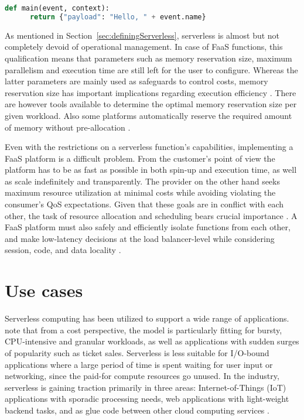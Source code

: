 \begin{lstlisting}[language=Python,caption=Example FaaS handler in Python,label=lst:handlerExample]
  def main(event, context):
      return {"payload": "Hello, " + event.name}
\end{lstlisting}

As mentioned in Section~\ref{sec:definingServerless}, serverless is almost but not completely devoid of operational management. In case of FaaS functions, this qualification means that parameters such as memory reservation size, maximum parallelism and execution time are still left for the user to configure. Whereas the latter parameters are mainly used as safeguards to control costs, memory reservation size has important implications regarding execution efficiency \parencite{lloydserverless}. There are however tools available to determine the optimal memory reservation size per given workload. Also some platforms automatically reserve the required amount of memory without pre-allocation \parencite{microsoft18azureFunctions}.

Even with the restrictions on a serverless function's capabilities, implementing a FaaS platform is a difficult problem. From the customer's point of view the platform has to be as fast as possible in both spin-up and execution time, as well as scale indefinitely and transparently. The provider on the other hand seeks maximum resource utilization at minimal costs while avoiding violating the consumer's QoS expectations. Given that these goals are in conflict with each other, the task of resource allocation and scheduling bears crucial importance \parencite{reza17controller}. A FaaS platform must also safely and efficiently isolate functions from each other, and make low-latency decisions at the load balancer-level while considering session, code, and data locality \parencite{hendrickson16openlambda}.

\section{Use cases} \label{sec:useCases}

Serverless computing has been utilized to support a wide range of applications. \textcite{baldini17currentTrends} note that from a cost perspective, the model is particularly fitting for bursty, CPU-intensive and granular workloads, as well as applications with sudden surges of popularity such as ticket sales. Serverless is less suitable for I/O-bound applications where a large period of time is spent waiting for user input or networking, since the paid-for compute resources go unused. In the industry, serverless is gaining traction primarily in three areas: Internet-of-Things (IoT) applications with sporadic processing needs, web applications with light-weight backend tasks, and as glue code between other cloud computing services \parencite{spillner18faaster}.

